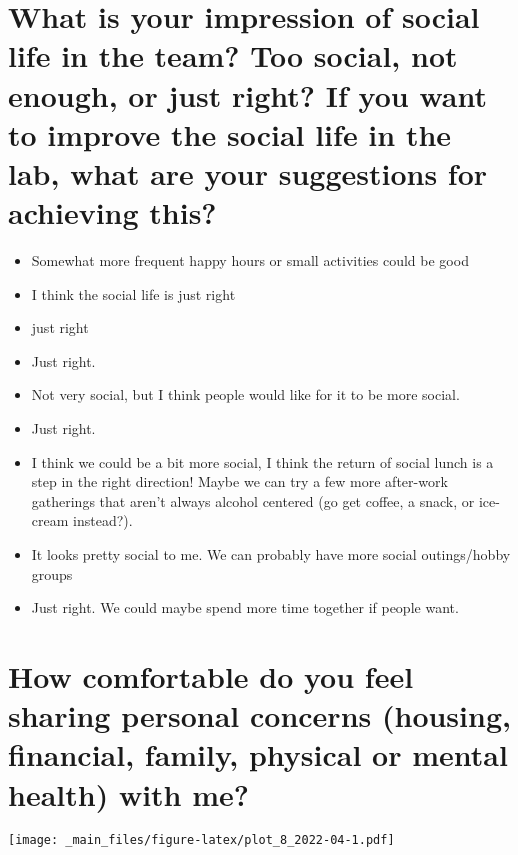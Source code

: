 \documentclass[
]{book}
\providecommand{\tightlist}{%
  \setlength{\itemsep}{0pt}\setlength{\parskip}{0pt}}
\begin{document}
\hypertarget{what-is-your-impression-of-social-life-in-the-team-too-social-not-enough-or-just-right-if-you-want-to-improve-the-social-life-in-the-lab-what-are-your-suggestions-for-achieving-this}{%
\section{What is your impression of social life in the team? Too social, not enough, or just right? If you want to improve the social life in the lab, what are your suggestions for achieving this?}\label{what-is-your-impression-of-social-life-in-the-team-too-social-not-enough-or-just-right-if-you-want-to-improve-the-social-life-in-the-lab-what-are-your-suggestions-for-achieving-this}}

\begin{itemize}
\tightlist
\item
  Somewhat more frequent happy hours or small activities could be good
\item
  I think the social life is just right
\item
  just right
\item
  Just right.
\item
  Not very social, but I think people would like for it to be more social.
\item
  Just right.
\item
  I think we could be a bit more social, I think the return of social lunch is a step in the right direction! Maybe we can try a few more after-work gatherings that aren't always alcohol centered (go get coffee, a snack, or ice-cream instead?).
\item
  It looks pretty social to me. We can probably have more social outings/hobby groups
\item
  Just right. We could maybe spend more time together if people want.
\end{itemize}

\hypertarget{how-comfortable-do-you-feel-sharing-personal-concerns-housing-financial-family-physical-or-mental-health-with-me}{%
\section{How comfortable do you feel sharing personal concerns (housing, financial, family, physical or mental health) with me?}\label{how-comfortable-do-you-feel-sharing-personal-concerns-housing-financial-family-physical-or-mental-health-with-me}}

\texttt{[image: \_main\_files/figure-latex/plot\_8\_2022-04-1.pdf]}
\end{document}

